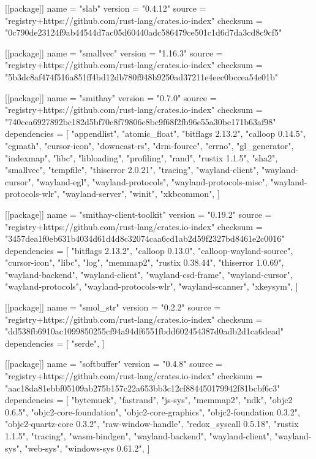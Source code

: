[[package]]
name = "slab"
version = "0.4.12"
source = "registry+https://github.com/rust-lang/crates.io-index"
checksum = "0c790de23124f9ab44544d7ac05d60440adc586479ce501c1d6d7da3cd8c9cf5"

[[package]]
name = "smallvec"
version = "1.16.3"
source = "registry+https://github.com/rust-lang/crates.io-index"
checksum = "5b3dc8af474f516a851ff4bd12db780f948b9250ad37211e4eec0bccea54e01b"

[[package]]
name = "smithay"
version = "0.7.0"
source = "registry+https://github.com/rust-lang/crates.io-index"
checksum = "740cea6927892bc182d5bf70c8f79806c8bc9f68f2fb96e55a30be171b63af98"
dependencies = [
 "appendlist",
 "atomic_float",
 "bitflags 2.13.2",
 "calloop 0.14.5",
 "cgmath",
 "cursor-icon",
 "downcast-rs",
 "drm-fourcc",
 "errno",
 "gl_generator",
 "indexmap",
 "libc",
 "libloading",
 "profiling",
 "rand",
 "rustix 1.1.5",
 "sha2",
 "smallvec",
 "tempfile",
 "thiserror 2.0.21",
 "tracing",
 "wayland-client",
 "wayland-cursor",
 "wayland-egl",
 "wayland-protocols",
 "wayland-protocols-misc",
 "wayland-protocols-wlr",
 "wayland-server",
 "winit",
 "xkbcommon",
]

[[package]]
name = "smithay-client-toolkit"
version = "0.19.2"
source = "registry+https://github.com/rust-lang/crates.io-index"
checksum = "3457dea1f0eb631b4034d61d4d8c32074caa6cd1ab2d59f2327bd8461e2c0016"
dependencies = [
 "bitflags 2.13.2",
 "calloop 0.13.0",
 "calloop-wayland-source",
 "cursor-icon",
 "libc",
 "log",
 "memmap2",
 "rustix 0.38.44",
 "thiserror 1.0.69",
 "wayland-backend",
 "wayland-client",
 "wayland-csd-frame",
 "wayland-cursor",
 "wayland-protocols",
 "wayland-protocols-wlr",
 "wayland-scanner",
 "xkeysym",
]

[[package]]
name = "smol_str"
version = "0.2.2"
source = "registry+https://github.com/rust-lang/crates.io-index"
checksum = "dd538fb6910ac1099850255cf94a94df6551fbdd602454387d0adb2d1ca6dead"
dependencies = [
 "serde",
]

[[package]]
name = "softbuffer"
version = "0.4.8"
source = "registry+https://github.com/rust-lang/crates.io-index"
checksum = "aac18da81ebbf05109ab275b157c22a653bb3c12cf884450179942f81bcbf6c3"
dependencies = [
 "bytemuck",
 "fastrand",
 "js-sys",
 "memmap2",
 "ndk",
 "objc2 0.6.5",
 "objc2-core-foundation",
 "objc2-core-graphics",
 "objc2-foundation 0.3.2",
 "objc2-quartz-core 0.3.2",
 "raw-window-handle",
 "redox_syscall 0.5.18",
 "rustix 1.1.5",
 "tracing",
 "wasm-bindgen",
 "wayland-backend",
 "wayland-client",
 "wayland-sys",
 "web-sys",
 "windows-sys 0.61.2",
]


